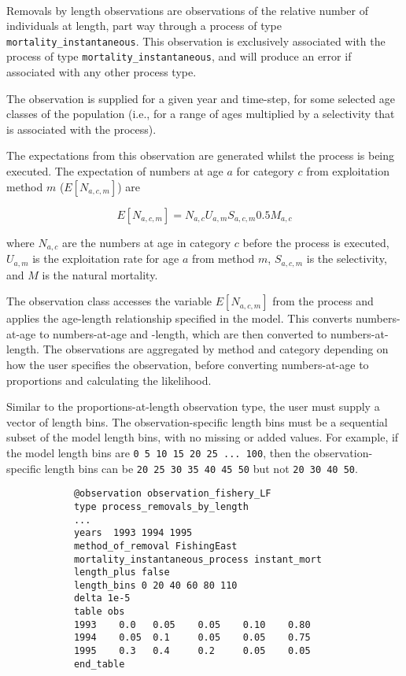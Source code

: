 \begin{itemize}
	\paragraph*{\label{sec:removals-by-length}}\label{sec:Observation-ProcessRemovalsByLength}
	
	Removals by length observations are observations of the relative number of individuals at length, part way through a process of type \texttt{mortality\_instantaneous}. This observation is exclusively associated with the process of type \texttt{mortality\_instantaneous}, and will produce an error if associated with any other process type.
	
	The observation is supplied for a given year and time-step, for some selected age classes of the population (i.e., for a range of ages multiplied by a selectivity that is associated with the process).
	
	The expectations from this observation are generated whilst the process is being executed. The expectation of numbers at age $a$ for category $c$ from exploitation method $m$ ($E[N_{a,c,m}]$) are
	
	\begin{equation}
	E[N_{a,c,m}] = N_{a,c} U_{a,m} S_{a,c,m} 0.5 M_{a,c}
	\end{equation}
	
	where $N_{a,c}$ are the numbers at age in category $c$ before the process is executed, $U_{a,m}$ is the exploitation rate for age $a$ from method $m$, $S_{a,c,m}$ is the selectivity, and $M$ is the natural mortality.
	
	The observation class accesses the variable $E[N_{a,c,m}]$ from the process and applies the age-length relationship specified in the model. This converts numbers-at-age to numbers-at-age and -length, which are then converted to numbers-at-length. The observations are aggregated by method and category depending on how the user specifies the observation, before converting numbers-at-age to proportions and calculating the likelihood.
	
	Similar to the proportions-at-length observation type, the user must supply a vector of length bins. The observation-specific length bins must be a sequential subset of the model length bins, with no missing or added values. For example, if the model length bins are \texttt{0 5 10 15 20 25 ... 100}, then the observation-specific length bins can be \texttt{20 25 30 35 40 45 50} but not \texttt{20 30 40 50}.
	
	{\small{\begin{verbatim}
			@observation observation_fishery_LF
			type process_removals_by_length
			...
			years  1993 1994 1995
			method_of_removal FishingEast
			mortality_instantaneous_process instant_mort
			length_plus false
			length_bins 0 20 40 60 80 110
			delta 1e-5
			table obs
			1993    0.0   0.05    0.05    0.10    0.80
			1994    0.05  0.1     0.05    0.05    0.75
			1995    0.3   0.4     0.2     0.05    0.05
			end_table
			

\end{verbatim}}}
\end{itemize}
